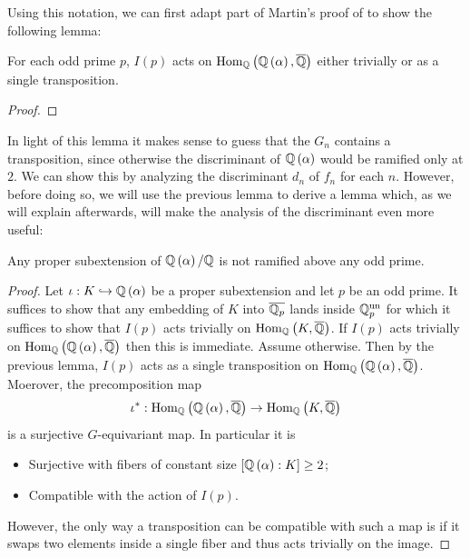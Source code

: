 \documentclass[../main.tex]{subfiles}
\begin{document}
Using this notation, we can first adapt part of Martin's proof of \cite[Theorem 2.5]{MARTIN2004213} to show the following lemma:
\begin{lemma}
  \label{lem:inertia-acts-as-transposition}
  For each odd prime $p$, $I\left( p \right)$ acts on $\operatorname{\rm Hom}_{\mathbb{Q}}\left( \mathbb{Q}\left( \alpha \right), \overline{\mathbb{Q}} \right)$ either trivially or as a single transposition.
\end{lemma}
\begin{proof}
\end{proof}
In light of this lemma it makes sense to guess that the $G_n$ contains a transposition, since otherwise the discriminant of $\mathbb{Q}\left( \alpha \right)$ would be ramified only at $2$.
We can show this by analyzing the discriminant $d_n$ of $f_n$ for each $n$.
However, before doing so, we will use the previous lemma to derive a lemma which, as we will explain afterwards, will make the analysis of the discriminant even more useful:
\begin{lemma}
  \label{lem:no-odd-ramification-in-subextensions}
  Any proper subextension of $\mathbb{Q}\left( \alpha \right)/\mathbb{Q}$ is not ramified above any odd prime.
\end{lemma}
\begin{proof}
  Let $\iota: K \hookrightarrow \mathbb{Q}\left( \alpha \right)$ be a proper subextension and let $p$ be an odd prime.
  It suffices to show that any embedding of $K$ into $\overline{\mathbb{Q}_p}$ lands inside $\mathbb{Q}_p^{\operatorname{un}}$ for which it suffices to show that $I\left( p \right)$ acts trivially on $\operatorname{\rm Hom}_{\mathbb{Q}}\left( K, \overline{\mathbb{Q}} \right)$.
  If $I\left( p \right)$ acts trivially on $\operatorname{\rm Hom}_{\mathbb{Q}}\left( \mathbb{Q}\left( \alpha \right), \overline{\mathbb{Q}} \right)$ then this is immediate.
  Assume otherwise.
  Then by the previous lemma, $I\left( p \right)$ acts as a single transposition on $\operatorname{\rm Hom}_{\mathbb{Q}}\left( \mathbb{Q}\left( \alpha \right), \overline{\mathbb{Q}} \right)$.
  Moerover, the precomposition map
  \[
    \iota^\ast : \operatorname{\rm Hom}_{\mathbb{Q}}\left( \mathbb{Q}\left( \alpha \right), \overline{\mathbb{Q}} \right) \to \operatorname{\rm Hom}_{\mathbb{Q}}\left( K, \overline{\mathbb{Q}} \right)
  \]
  is a surjective $G$-equivariant map.
  In particular it is 
  \begin{itemize}
    \item Surjective with fibers of constant size $\left[ \mathbb{Q}\left( \alpha \right) : K \right] \geq 2$;
    \item Compatible with the action of $I\left( p \right)$.
  \end{itemize}
  However, the only way a transposition can be compatible with such a map is if it swaps two elements inside a single fiber and thus acts trivially on the image. 
\end{proof}
\end{document}
